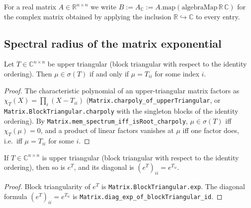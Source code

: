 \begin{definition}
    \label{def:complexification}
    For a real matrix $A \in \mathbb{R}^{n \times n}$ we write $B := A_{\mathbb{C}}
    := A.\mathrm{map}(\mathrm{algebraMap}\,\mathbb{R}\,\mathbb{C})$ for the complex
    matrix obtained by applying the inclusion $\mathbb{R} \hookrightarrow
    \mathbb{C}$ to every entry.
\end{definition}

\subsection{Spectral radius of the matrix exponential}

\begin{lemma}
    \label{lem:spectrum_upperTriangular}
    \leanok
    Let $T \in \mathbb{C}^{n \times n}$ be upper triangular (block triangular
    with respect to the identity ordering). Then $\mu \in \sigma(T)$ if and only
    if $\mu = T_{ii}$ for some index $i$.
\end{lemma}
\begin{proof}
    The characteristic polynomial of an upper-triangular matrix factors as
    $\chi_T(X) = \prod_i (X - T_{ii})$
    (\texttt{Matrix.charpoly\_of\_upperTriangular}, or
    \texttt{Matrix.BlockTriangular.charpoly} with the singleton blocks of the
    identity ordering). By \texttt{Matrix.mem\_spectrum\_iff\_isRoot\_charpoly},
    $\mu \in \sigma(T)$ iff $\chi_T(\mu) = 0$, and a product of linear factors
    vanishes at $\mu$ iff one factor does, i.e.\ iff $\mu = T_{ii}$ for some $i$.
\end{proof}

\begin{lemma}
    \label{lem:exp_upperTriangular}
    \leanok
    If $T \in \mathbb{C}^{n \times n}$ is upper triangular (block triangular with
    respect to the identity ordering), then so is $e^{T}$, and its diagonal is
    $(e^{T})_{ii} = e^{T_{ii}}$.
\end{lemma}
\begin{proof}
    Block triangularity of $e^{T}$ is \texttt{Matrix.BlockTriangular.exp}. The
    diagonal formula $(e^{T})_{ii} = e^{T_{ii}}$ is
    \texttt{Matrix.diag\_exp\_of\_blockTriangular\_id}.
\end{proof}


